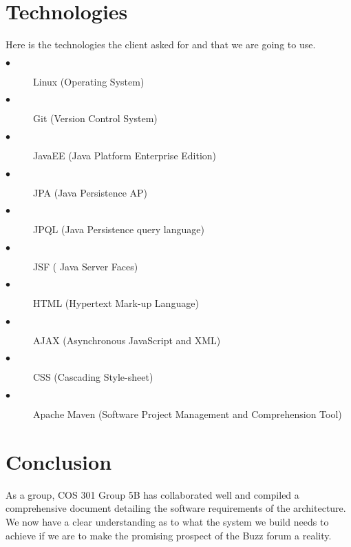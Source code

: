 \documentclass[hidelinks, 12pt]{article}
\begin{document}
\section{Technologies}
Here is the technologies the client asked for and that we are going to use.
\begin{description}
  \item[$\bullet$] Linux (Operating System)
  \item[$\bullet$] Git (Version Control System)
  \item[$\bullet$] JavaEE (Java Platform Enterprise Edition)
  \item[$\bullet$] JPA (Java Persistence AP)
  \item[$\bullet$] JPQL (Java Persistence query language)
  \item[$\bullet$] JSF ( Java Server Faces)
  \item[$\bullet$] HTML (Hypertext Mark-up Language)
  \item[$\bullet$] AJAX (Asynchronous JavaScript and XML)
  \item[$\bullet$] CSS (Cascading Style-sheet)
  \item[$\bullet$] Apache Maven (Software Project Management and Comprehension Tool)

\end{description}

\section{Conclusion}
As a group, COS 301 Group 5B has collaborated well and compiled a comprehensive document detailing the software requirements of the architecture. We now have a clear understanding as to what the system we build needs to achieve if we are to make the promising prospect of the Buzz forum a reality.
\end{document}
